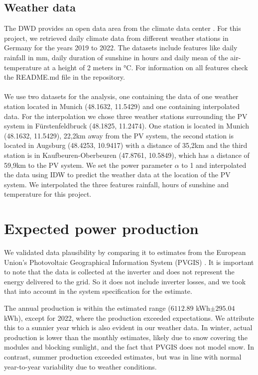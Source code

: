 \documentclass{article}
\begin{document}
\subsection{Weather data}
The DWD provides an open data area from the climate data center \cite{CDC}. 
For this project, we retrieved daily climate data from different weather stations in Germany for the years 2019 to 2022. 
The datasets include features like daily rainfall in mm, daily duration of sunshine in hours and daily mean of the air-temperature at a height of 2 meters in °C. 
For information on all features check the README.md file in the repository. \\ 
\\
We use two datasets for the analysis, one containing the data of one weather station located in Munich (48.1632, 11.5429) and one containing interpolated data. For the interpolation we chose three weather stations surrounding the PV system in Fürstenfeldbruck (48.1825, 11.2474). 
One station is located in Munich (48.1632, 11.5429), 22,2km away from the PV system, the second station is located in Augsburg (48.4253, 10.9417) with a distance of 35,2km and the third station is in Kaufbeuren-Oberbeuren (47.8761, 10.5849), which has a distance of 59,9km to the PV system. 
We set the power parameter $\alpha$ to 1 and interpolated the data using IDW to predict the weather data at the location of the PV system. We interpolated the three features rainfall, hours of sunshine and temperature for this project.

\section{Expected power production}\label{sec:methods}

We validated data plausibility by comparing it to estimates from the European Union's Photovoltaic Geographical Information System (PVGIS) \cite{PVGIS}. It is important to note that the data is collected at the inverter and does not represent the energy delivered to the grid. So it does not include inverter losses, and we took that into account in the system specification for the estimate.

The annual production is within the estimated range ($6112.89$ kWh$ \pm 295.04$ kWh), except for 2022, where the production exceeded expectations. We attribute this to a sunnier year \citep{DWD2022} which is also evident in our weather data. In winter, actual production is lower than the monthly estimates, likely due to snow covering the modules and blocking sunlight, and the fact that PVGIS does not model snow. In contrast, summer production exceeded estimates, but was in line with normal year-to-year variability due to weather conditions.
\end{document}
